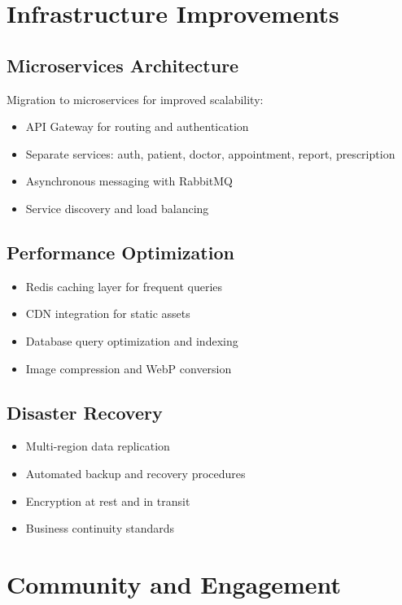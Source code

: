 \section{Infrastructure Improvements}

\subsection{Microservices Architecture}
Migration to microservices for improved scalability:
\begin{itemize}
    \item API Gateway for routing and authentication
    \item Separate services: auth, patient, doctor, appointment, report, prescription
    \item Asynchronous messaging with RabbitMQ
    \item Service discovery and load balancing
\end{itemize}

\subsection{Performance Optimization}
\begin{itemize}
    \item Redis caching layer for frequent queries
    \item CDN integration for static assets
    \item Database query optimization and indexing
    \item Image compression and WebP conversion
\end{itemize}

\subsection{Disaster Recovery}
\begin{itemize}
    \item Multi-region data replication
    \item Automated backup and recovery procedures
    \item Encryption at rest and in transit
    \item Business continuity standards
\end{itemize}

\section{Community and Engagement}

